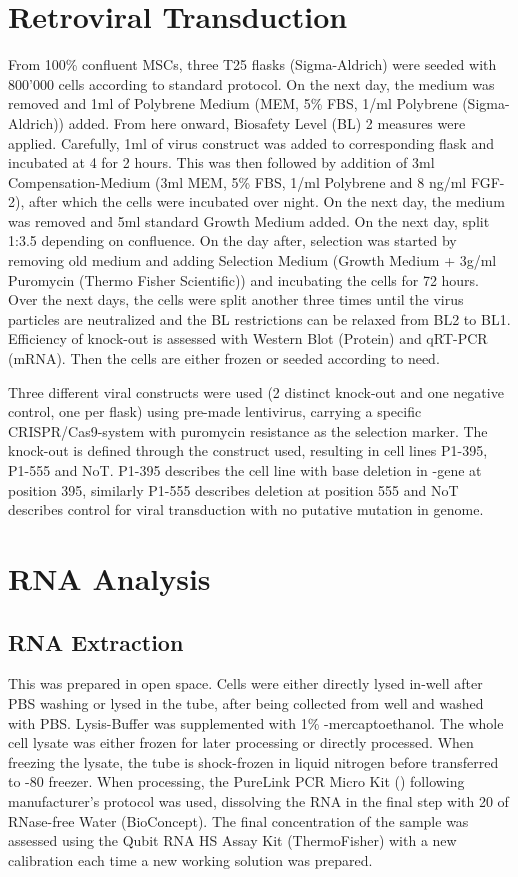 \section{Retroviral Transduction}
\label{sec:RetroVir}
From 100\% confluent MSCs, three T25 flasks (Sigma-Aldrich) were seeded with 800'000 cells according to standard protocol. On the next day, the medium was removed and 1ml of Polybrene Medium (MEM\textalpha{}, 5\% FBS, 1\mul{}/ml Polybrene (Sigma-Aldrich)) added. From here onward, Biosafety Level (BL) 2 measures were applied. Carefully, 1ml of virus construct was added to corresponding flask and incubated at 4 \degC for 2 hours. This was then followed by addition of 3ml Compensation-Medium (3ml MEM\textalpha{}, 5\% FBS, 1\mul{}/ml Polybrene and 8 ng/ml FGF-2), after which the cells were incubated over night. On the next day, the medium was removed and 5ml standard Growth Medium added. On the next day, split 1:3.5 depending on confluence. On the day after, selection was started by removing old medium and adding Selection Medium (Growth Medium + 3\textmu{}g/ml Puromycin (Thermo Fisher Scientific)) and incubating the cells for 72 hours. Over the next days, the cells were split another three times until the virus particles are neutralized and the BL restrictions can be relaxed from BL2 to BL1. Efficiency of knock-out is  assessed with Western Blot (Protein) and qRT-PCR (mRNA). Then the cells are either frozen or seeded according to need. 

Three different viral constructs were used (2 distinct \Piezo{} knock-out and one negative control, one per flask) using pre-made lentivirus, carrying a specific CRISPR/Cas9-system with puromycin resistance as the selection marker. The knock-out is defined through the construct used, resulting in cell lines P1-395, P1-555 and NoT. P1-395 describes the cell line with base deletion in \PiezoGene{}-gene at position 395, similarly P1-555 describes deletion at position 555 and NoT describes control for viral transduction with no putative mutation in genome.


\section{RNA Analysis}
\subsection{RNA Extraction}
This was prepared in open space. Cells were either directly lysed in-well after PBS washing or lysed in the tube, after being collected from well and washed with PBS. Lysis-Buffer was supplemented with 1\% \textbeta-mercaptoethanol. The whole cell lysate was either frozen for later processing or directly processed. When freezing the lysate, the tube is shock-frozen in liquid nitrogen before transferred to -80 \degC freezer. When processing, the PureLink PCR Micro Kit () following manufacturer's protocol was used, dissolving the RNA in the final step with 20\mul{} of RNase-free Water (BioConcept). The final concentration of the sample was assessed using the Qubit RNA HS Assay Kit (ThermoFisher) with a new calibration each time a new working solution was prepared.


